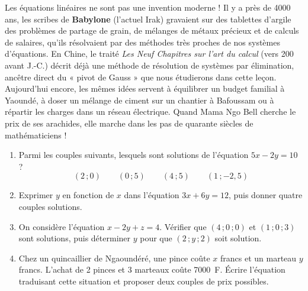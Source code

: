 \documentclass[11pt]{article}
\begin{document}
\begin{savaistu}
Les équations linéaires ne sont pas une invention moderne ! Il y a près de 4000 ans, les scribes de \textbf{Babylone} (l'actuel Irak) gravaient sur des tablettes d'argile des problèmes de partage de grain, de mélanges de métaux précieux et de calculs de salaires, qu'ils résolvaient par des méthodes très proches de nos systèmes d'équations. En Chine, le traité \emph{Les Neuf Chapitres sur l'art du calcul} (vers 200 avant J.-C.) décrit déjà une méthode de résolution de systèmes par élimination, ancêtre direct du « pivot de Gauss » que nous étudierons dans cette leçon. Aujourd'hui encore, les mêmes idées servent à équilibrer un budget familial à Yaoundé, à doser un mélange de ciment sur un chantier à Bafoussam ou à répartir les charges dans un réseau électrique. Quand Mama Ngo Bell cherche le prix de ses arachides, elle marche dans les pas de quarante siècles de mathématiciens !
\end{savaistu}

\begin{exercice}
\begin{enumerate}
\item Parmi les couples suivants, lesquels sont solutions de l'équation $5x - 2y = 10$ ?
\[ (2 \,; 0) \qquad (0 \,; 5) \qquad (4 \,; 5) \qquad (1 \,; -2{,}5) \]
\item Exprimer $y$ en fonction de $x$ dans l'équation $3x + 6y = 12$, puis donner quatre couples solutions.
\item On considère l'équation $x - 2y + z = 4$. Vérifier que $(4 \,; 0 \,; 0)$ et $(1 \,; 0 \,; 3)$ sont solutions, puis déterminer $y$ pour que $(2 \,; y \,; 2)$ soit solution.
\item Chez un quincaillier de Ngaoundéré, une pince coûte $x$ francs et un marteau $y$ francs. L'achat de 2 pinces et 3 marteaux coûte \SI{7000}{F}. Écrire l'équation traduisant cette situation et proposer deux couples de prix possibles.
\end{enumerate}
\end{exercice}
\end{document}
